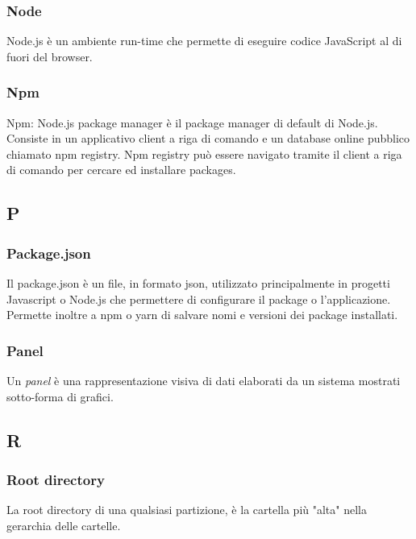 	\subsubsection*{Node} 
	\label{sec:node}
Node.js è un ambiente run-time che permette di eseguire codice JavaScript al di fuori del browser.

	\subsubsection*{Npm} 
	\label{sec:npm}
Npm: Node.js package manager è il package manager di default di Node.js. Consiste in un applicativo client a riga di comando e un database online pubblico chiamato npm registry. Npm registry può essere navigato tramite il client a riga di comando per cercare ed installare packages.


\subsection*{P}

	\subsubsection*{Package.json} 
	\label{sec:package}
Il package.json è un file, in formato json, utilizzato principalmente in progetti Javascript o Node.js che permettere di configurare il package o l'applicazione. Permette inoltre a npm o yarn di salvare nomi e versioni dei package installati.

	\subsubsection*{Panel} 
	\label{sec:panel}
Un \emph{panel} è una rappresentazione visiva di dati elaborati da un sistema mostrati sotto-forma di grafici.


\subsection*{R}

	\subsubsection*{Root directory}
	\label{sec:rootdirectory}
La root directory di una qualsiasi partizione, è la cartella più "alta" nella gerarchia delle cartelle.




